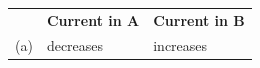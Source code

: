 \begin{enumerate}[noitemsep, label=\textbf{\arabic*}. ]
\begin{enumerate}[noitemsep, label=\textbf{\alph*}. ]
{\begin{center}
      \label{m38776*id68590}
      
    \noindent
      \tablelasttail{}
      \begin{xtabular*}{\mytablewidth}[t]{|p{10\mystarwidth}|p{10\mystarwidth}|p{10\mystarwidth}|}\hline
    
    
         &
    
    
        \textbf{Current in A} &
    
    
        \textbf{Current in B}%
     \tabularnewline{}
    
    
        (a) &
    
    
        decreases &
    
    
        increases%
     \tabularnewline{}
    

\end{xtabular*}
\end{center}}
\end{enumerate}
\end{enumerate}
